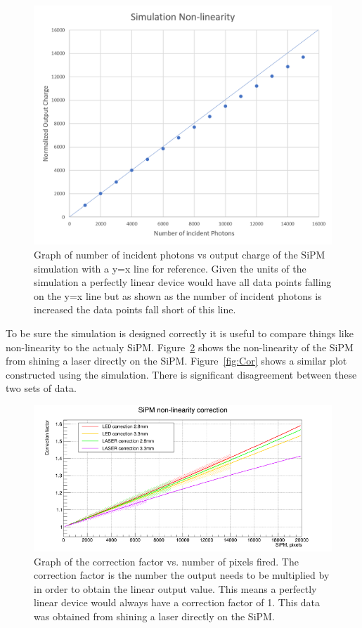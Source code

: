 \begin{figure}
\centering
\includegraphics[width=0.8\linewidth]{Figures/SimNon.png}
\caption{Graph of number of incident photons vs output charge of the SiPM simulation with a y=x line for reference. Given the units of the simulation a perfectly linear device would have all data points falling on the y=x line but as shown as the number of incident photons is increased the data points fall short of this line.}
\label{fig:SimNon}
\end{figure}

To be sure the simulation is designed correctly it is useful to compare things like non-linearity to the actualy SiPM. Figure~\ref{fig:NonLin} shows the non-linearity of the SiPM from shining a laser directly on the SiPM. Figure~\ref{fig:Cor} shows a similar plot constructed using the simulation. There is significant disagreement between these two sets of data.

\begin{figure}
\centering
\includegraphics[width=\linewidth]{Figures/LaserNonLin.png}
\caption{Graph of the correction factor vs. number of pixels fired. The correction factor is the number the output needs to be multiplied by in order to obtain the linear output value. This means a perfectly linear device would always have a correction factor of 1. This data was obtained from shining a laser directly on the SiPM.}
\label{fig:NonLin}
\end{figure}

